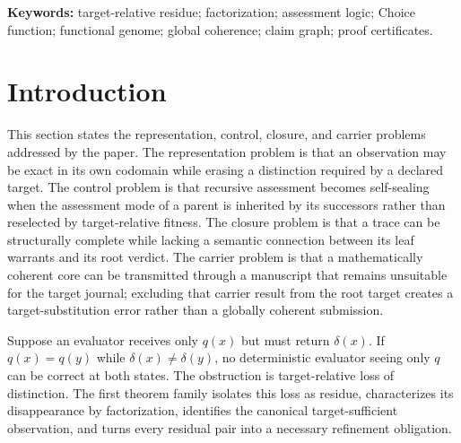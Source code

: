 \documentclass[10pt]{article}
\newcommand{\GCsub}{\mathsf{GC}_{\mathrm{sub}}}
\begin{document}
\begin{abstract}
For journal use, the assessed object includes the article's mathematical core, carrier adequacy, artifact fidelity, recommendation-changing referee challenges, and submission-stage editorial status in one functional genome.  A detachable carrier recommendation of major revision is incompatible with an overall globally coherent submission-stage verdict.  Version 23 is written under the explicit design hypothesis that a fresh carrier-complete assessment returns $\GCsub$.  That hypothesis is not represented as an executed certificate: before the independent Claude Code audit, the recorded actual status is \ActualOverallGCA.  The package supplies a frozen carrier-complete review instance, schemas, a non-executable trace template, qpdf and Lean check scripts, and a structural output gate.  Claude Code must independently execute the review, produce node-specific Choice and execution records, import every recommendation-changing objection, and write a hash-bound external status record from the actual result without changing the frozen manuscript inputs.
\end{abstract}

\noindent\textbf{Keywords:} target-relative residue; factorization; assessment logic; Choice function; functional genome; global coherence; claim graph; proof certificates.




\section{Introduction}

This section states the representation, control, closure, and carrier problems addressed by the paper.  The representation problem is that an observation may be exact in its own codomain while erasing a distinction required by a declared target.  The control problem is that recursive assessment becomes self-sealing when the assessment mode of a parent is inherited by its successors rather than reselected by target-relative fitness.  The closure problem is that a trace can be structurally complete while lacking a semantic connection between its leaf warrants and its root verdict.  The carrier problem is that a mathematically coherent core can be transmitted through a manuscript that remains unsuitable for the target journal; excluding that carrier result from the root target creates a target-substitution error rather than a globally coherent submission.

Suppose an evaluator receives only $q(x)$ but must return $\delta(x)$.  If $q(x)=q(y)$ while $\delta(x)\neq\delta(y)$, no deterministic evaluator seeing only $q$ can be correct at both states.  The obstruction is target-relative loss of distinction.  The first theorem family isolates this loss as residue, characterizes its disappearance by factorization, identifies the canonical target-sufficient observation, and turns every residual pair into a necessary refinement obligation.
\end{document}
